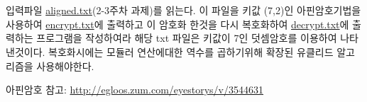 \documentclass{oblivoir}
\begin{document}
\section{}
입력파일  \href{https://www.dropbox.com/s/wd20ebjvi4m6m0c/aligned.txt?dl=0}{aligned.txt}(2-3주차 과제)를 읽는다. 이 파일을 키값 (7,2)인 아핀암호기법을 사용하여 \href{https://www.dropbox.com/s/9d30fxbhz2nr869/encrypt.txt?dl=0}{encrypt.txt}에 출력하고 이 암호화 한것을 다시 복호화하여  \href{https://www.dropbox.com/s/vm6ims2kz18nfez/decrypt.txt?dl=0}{decrypt.txt}에 출력하는 프로그램을 작성하여라 해당 txt 파일은 키값이 7인 덧셈암호를 이용하여 나타낸것이다.
복호화시에는 모듈러 연산에대한 역수를 곱하기위해 확장된 유클리드 알고리즘을 사용해야한다.
\par
아핀암호 참고: \url{http://egloos.zum.com/eyestorys/v/3544631}
\end{document}
